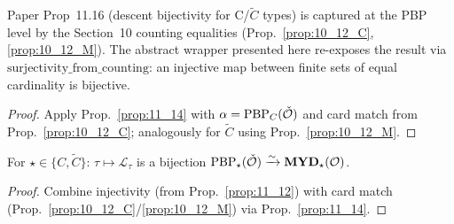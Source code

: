 \begin{proposition}
  \label{prop:11_16}
  \leanok
  Paper Prop~11.16 (descent bijectivity for C/$\tilde{C}$ types) is captured at
  the PBP level by the Section~10 counting equalities (Prop.~\ref{prop:10_12_C},
  \ref{prop:10_12_M}). The abstract wrapper presented here re-exposes the result
  via $\mathrm{surjectivity\_from\_counting}$: an injective map between finite
  sets of equal cardinality is bijective.
\end{proposition}
\begin{proof}
  \leanok
  Apply Prop.~\ref{prop:11_14} with $\alpha = \mathrm{PBP}_C(\check{\mathcal{O}})$ and card match from Prop.~\ref{prop:10_12_C}; analogously for $\tilde{C}$ using Prop.~\ref{prop:10_12_M}.
\end{proof}


\begin{proposition}
  \label{prop:11_17}
  \leanok
  For $\star \in \{C, \tilde{C}\}$: $\tau \mapsto \mathcal{L}_\tau$ is a bijection
  $\mathrm{PBP}_\star(\check{\mathcal{O}}) \xrightarrow{\sim} \mathbf{MYD}_\star(\mathcal{O})$.
\end{proposition}
\begin{proof}
  \leanok
  Combine injectivity (from Prop.~\ref{prop:11_12}) with card match (Prop.~\ref{prop:10_12_C}/\ref{prop:10_12_M}) via Prop.~\ref{prop:11_14}.
\end{proof}

